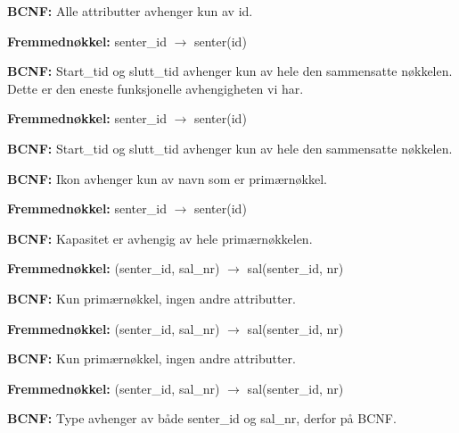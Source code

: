 \vspace{0.8em}
\textbf{BCNF:} Alle attributter avhenger kun av id.

\vspace{0.8em}
\textbf{Fremmednøkkel:} senter\_id $\rightarrow$ senter(id)\par
\vspace{0.15em}
\textbf{BCNF:} Start\_tid og slutt\_tid avhenger kun av hele den sammensatte nøkkelen. Dette er den eneste funksjonelle avhengigheten vi har.

\vspace{0.8em}
\textbf{Fremmednøkkel:} senter\_id $\rightarrow$ senter(id)\par
\vspace{0.15em}
\textbf{BCNF:} Start\_tid og slutt\_tid avhenger kun av hele den sammensatte nøkkelen.

\vspace{0.8em}
\textbf{BCNF:} Ikon avhenger kun av navn som er primærnøkkel.

\vspace{0.8em}
\textbf{Fremmednøkkel:} senter\_id $\rightarrow$ senter(id)\par
\vspace{0.15em}
\textbf{BCNF:} Kapasitet er avhengig av hele primærnøkkelen.

\vspace{0.8em}
\textbf{Fremmednøkkel:} (senter\_id, sal\_nr) $\rightarrow$ sal(senter\_id, nr)\par
\vspace{0.15em}
\textbf{BCNF:} Kun primærnøkkel, ingen andre attributter.

\vspace{0.8em}
\textbf{Fremmednøkkel:} (senter\_id, sal\_nr) $\rightarrow$ sal(senter\_id, nr)\par
\vspace{0.15em}
\textbf{BCNF:} Kun primærnøkkel, ingen andre attributter.

\vspace{0.8em}
\textbf{Fremmednøkkel:} (senter\_id, sal\_nr) $\rightarrow$ sal(senter\_id, nr)\par
\vspace{0.15em}
\textbf{BCNF:} Type avhenger av både senter\_id og sal\_nr, derfor på BCNF.

